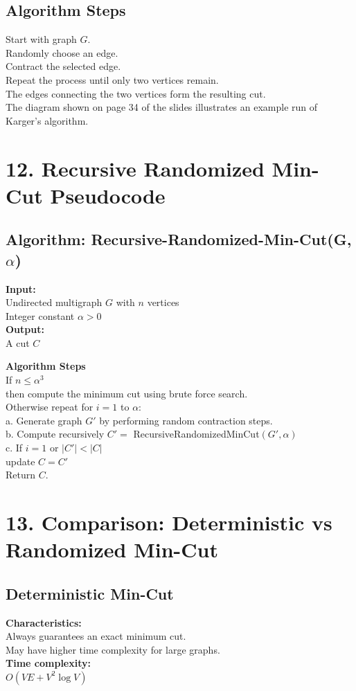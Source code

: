 \documentclass{article}
\begin{document}
\subsection{Algorithm Steps}
Start with graph $G$. \\
Randomly choose an edge. \\
Contract the selected edge. \\
Repeat the process until only two vertices remain. \\
The edges connecting the two vertices form the resulting cut. \\
The diagram shown on page 34 of the slides illustrates an example run of Karger's algorithm.

\section{12. Recursive Randomized Min-Cut Pseudocode}

\subsection{Algorithm: Recursive-Randomized-Min-Cut(G, $\alpha$)}
\textbf{Input:} \\
Undirected multigraph $G$ with $n$ vertices \\
Integer constant $\alpha>0$ \\
\textbf{Output:} \\
A cut $C$

\textbf{Algorithm Steps} \\
If $n \le \alpha^3$ \\
then compute the minimum cut using brute force search. \\
Otherwise repeat for $i=1$ to $\alpha$: \\
a. Generate graph $G'$ by performing random contraction steps. \\
b. Compute recursively $C'=$ RecursiveRandomizedMinCut$(G',\alpha)$ \\
c. If $i=1$ or $|C'| < |C|$ \\
update $C=C'$ \\
Return $C$.

\section{13. Comparison: Deterministic vs Randomized Min-Cut}

\subsection{Deterministic Min-Cut}
\textbf{Characteristics:} \\
Always guarantees an exact minimum cut. \\
May have higher time complexity for large graphs. \\
\textbf{Time complexity:} \\
$O(VE + V^2 \log V)$
\end{document}
